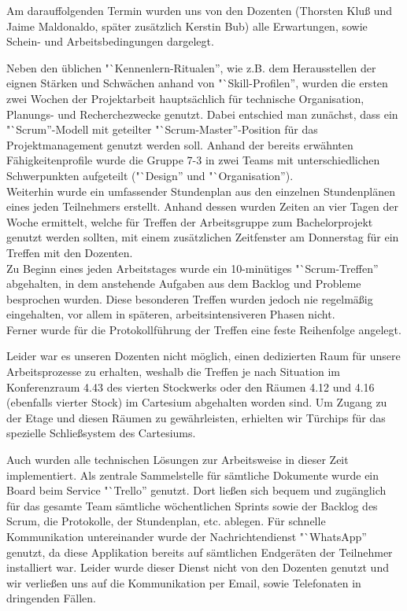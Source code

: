 \documentclass{Bericht}
\begin{document}
		Am darauffolgenden Termin wurden uns von den Dozenten (Thorsten Kluß und Jaime Maldonaldo, später zusätzlich Kerstin Bub) alle Erwartungen, sowie Schein- und Arbeitsbedingungen dargelegt.

		Neben den üblichen "`Kennenlern-Ritualen'', wie z.B. dem Herausstellen der eignen Stärken und Schwächen anhand von "`Skill-Profilen'', wurden die ersten zwei Wochen der Projektarbeit hauptsächlich für technische Organisation, Planungs- und Recherchezwecke genutzt. Dabei entschied man zunächst, dass ein "`Scrum''-Modell mit geteilter "`Scrum-Master''-Position für das Projektmanagement genutzt werden soll. Anhand der bereits erwähnten Fähigkeitenprofile wurde die Gruppe 7-3 in zwei Teams mit unterschiedlichen Schwerpunkten aufgeteilt ("`Design'' und "`Organisation'').\\
		Weiterhin wurde ein umfassender Stundenplan aus den einzelnen Stundenplänen eines jeden Teilnehmers erstellt. Anhand dessen wurden Zeiten an vier Tagen der Woche ermittelt, welche für Treffen der Arbeitsgruppe zum Bachelorprojekt genutzt werden sollten, mit einem zusätzlichen Zeitfenster am Donnerstag für ein Treffen mit den Dozenten. \\
		Zu Beginn eines jeden Arbeitstages wurde ein 10-minütiges "`Scrum-Treffen'' abgehalten, in dem anstehende Aufgaben aus dem Backlog und Probleme besprochen wurden. Diese besonderen Treffen wurden jedoch nie regelmäßig eingehalten, vor allem in späteren, arbeitsintensiveren Phasen nicht.\\
		Ferner wurde für die Protokollführung der Treffen eine feste Reihenfolge angelegt.

		Leider war es unseren Dozenten nicht möglich, einen dedizierten Raum für unsere Arbeitsprozesse zu erhalten, weshalb die Treffen je nach Situation im Konferenzraum 4.43 des vierten Stockwerks oder den Räumen 4.12 und 4.16 (ebenfalls vierter Stock) im Cartesium abgehalten worden sind. Um Zugang zu der Etage und diesen Räumen zu gewährleisten, erhielten wir Türchips für das spezielle Schließsystem des Cartesiums.

		Auch wurden alle technischen Lösungen zur Arbeitsweise in dieser Zeit implementiert. Als zentrale Sammelstelle für sämtliche Dokumente wurde ein Board beim Service "`Trello'' genutzt. Dort ließen sich bequem und zugänglich für das gesamte Team sämtliche wöchentlichen Sprints sowie der Backlog des Scrum, die Protokolle, der Stundenplan, etc. ablegen. Für schnelle Kommunikation untereinander wurde der Nachrichtendienst "`WhatsApp'' genutzt, da diese Applikation bereits auf sämtlichen Endgeräten der Teilnehmer installiert war. Leider wurde dieser Dienst nicht von den Dozenten genutzt und wir verließen uns auf die Kommunikation per Email, sowie Telefonaten in dringenden Fällen.
		
\end{document}
